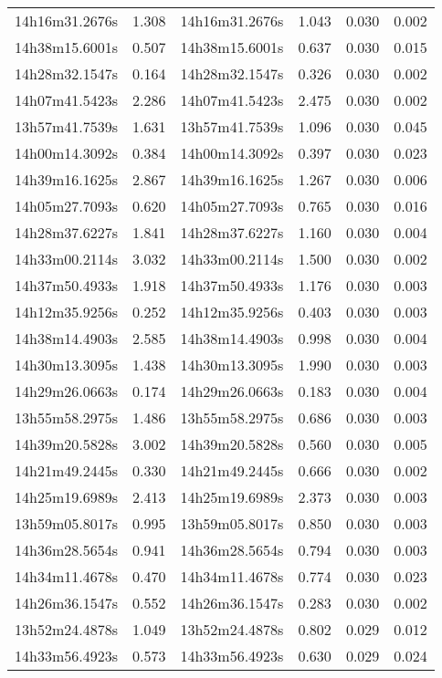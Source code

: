 \begin{table}
\begin{tabular}{cccccc}
14h16m31.2676s & 1.308 & 14h16m31.2676s & 1.043 & 0.030 & 0.002 \\
14h38m15.6001s & 0.507 & 14h38m15.6001s & 0.637 & 0.030 & 0.015 \\
14h28m32.1547s & 0.164 & 14h28m32.1547s & 0.326 & 0.030 & 0.002 \\
14h07m41.5423s & 2.286 & 14h07m41.5423s & 2.475 & 0.030 & 0.002 \\
13h57m41.7539s & 1.631 & 13h57m41.7539s & 1.096 & 0.030 & 0.045 \\
14h00m14.3092s & 0.384 & 14h00m14.3092s & 0.397 & 0.030 & 0.023 \\
14h39m16.1625s & 2.867 & 14h39m16.1625s & 1.267 & 0.030 & 0.006 \\
14h05m27.7093s & 0.620 & 14h05m27.7093s & 0.765 & 0.030 & 0.016 \\
14h28m37.6227s & 1.841 & 14h28m37.6227s & 1.160 & 0.030 & 0.004 \\
14h33m00.2114s & 3.032 & 14h33m00.2114s & 1.500 & 0.030 & 0.002 \\
14h37m50.4933s & 1.918 & 14h37m50.4933s & 1.176 & 0.030 & 0.003 \\
14h12m35.9256s & 0.252 & 14h12m35.9256s & 0.403 & 0.030 & 0.003 \\
14h38m14.4903s & 2.585 & 14h38m14.4903s & 0.998 & 0.030 & 0.004 \\
14h30m13.3095s & 1.438 & 14h30m13.3095s & 1.990 & 0.030 & 0.003 \\
14h29m26.0663s & 0.174 & 14h29m26.0663s & 0.183 & 0.030 & 0.004 \\
13h55m58.2975s & 1.486 & 13h55m58.2975s & 0.686 & 0.030 & 0.003 \\
14h39m20.5828s & 3.002 & 14h39m20.5828s & 0.560 & 0.030 & 0.005 \\
14h21m49.2445s & 0.330 & 14h21m49.2445s & 0.666 & 0.030 & 0.002 \\
14h25m19.6989s & 2.413 & 14h25m19.6989s & 2.373 & 0.030 & 0.003 \\
13h59m05.8017s & 0.995 & 13h59m05.8017s & 0.850 & 0.030 & 0.003 \\
14h36m28.5654s & 0.941 & 14h36m28.5654s & 0.794 & 0.030 & 0.003 \\
14h34m11.4678s & 0.470 & 14h34m11.4678s & 0.774 & 0.030 & 0.023 \\
14h26m36.1547s & 0.552 & 14h26m36.1547s & 0.283 & 0.030 & 0.002 \\
13h52m24.4878s & 1.049 & 13h52m24.4878s & 0.802 & 0.029 & 0.012 \\
14h33m56.4923s & 0.573 & 14h33m56.4923s & 0.630 & 0.029 & 0.024 \\

\end{tabular}
\end{table}
